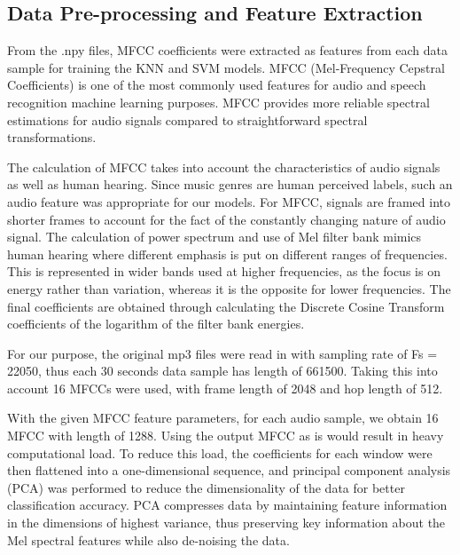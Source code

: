 \documentclass[letterpaper, 12 pt, conference]{ieeeconf}  %
\begin{document}

\subsection{Data Pre-processing and Feature Extraction}


From the .npy files, MFCC coefficients were extracted as features from each data sample for training the KNN and SVM models. MFCC (Mel-Frequency Cepstral Coefficients) is one of the most commonly used features for audio and speech recognition machine learning purposes. MFCC provides more reliable spectral estimations for audio signals compared to straightforward spectral transformations. 

The calculation of MFCC takes into account the characteristics of audio signals as well as human hearing. Since music genres are human perceived labels, such an audio feature was appropriate for our models. For MFCC, signals are framed into shorter frames to account for the fact of the constantly changing nature of audio signal. The calculation of power spectrum and use of Mel filter bank mimics human hearing where different emphasis is put on different ranges of frequencies. This is represented in wider bands used at higher frequencies, as the focus is on energy rather than variation, whereas it is the opposite for lower frequencies. The final coefficients are obtained through calculating the Discrete Cosine Transform coefficients of the logarithm of the filter bank energies. 

For our purpose, the original mp3 files were read in with sampling rate of Fs = 22050, thus each 30 seconds data sample has length of 661500. Taking this into account 16 MFCCs were used, with frame length of 2048 and hop length of 512. 

With the given MFCC feature parameters, for each audio sample, we obtain 16 MFCC with length of 1288. Using the output MFCC as is would result in heavy computational load. To reduce this load, the coefficients for each window were then flattened into a one-dimensional sequence, and principal component analysis (PCA) was performed to reduce the dimensionality of the data for better classification accuracy. PCA compresses data by maintaining feature information in the dimensions of highest variance, thus preserving key information about the Mel spectral features while also de-noising the data.
\end{document}

